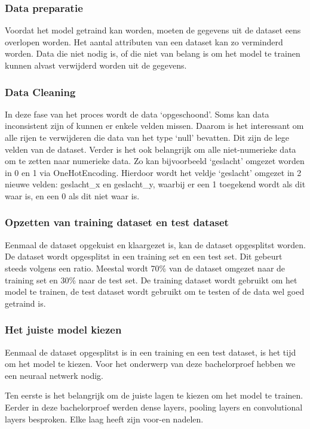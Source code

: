\subsubsection{Data preparatie}
\label{sec:datapreparatie}
Voordat het model getraind kan worden, moeten de gegevens uit de dataset eens overlopen worden. Het aantal attributen van een dataset kan zo verminderd worden. Data die niet nodig is, of die niet van belang is om het model te trainen kunnen alvast verwijderd worden uit de gegevens. 

\subsubsection{Data Cleaning}
\label{sec:datacleaning}
In deze fase van het proces wordt de data ‘opgeschoond’. Soms kan data inconsistent zijn of kunnen er enkele velden missen. Daarom is het interessant om alle rijen te verwijderen die data van het type ‘null’ bevatten. Dit zijn de lege velden van de dataset. Verder is het ook belangrijk om alle niet-numerieke data om te zetten naar numerieke data. Zo kan bijvoorbeeld ‘geslacht’ omgezet worden in 0 en 1 via \gls{OneHotEncoding}. Hierdoor wordt het veldje ‘geslacht’ omgezet in 2 nieuwe velden: geslacht\_x en geslacht\_y, waarbij er een 1 toegekend wordt als dit waar is, en een 0 als dit niet waar is. 

\subsubsection{Opzetten van training dataset en test dataset}
\label{sec:opzetten}
Eenmaal de dataset opgekuist en klaargezet is, kan de dataset opgesplitst worden. De dataset wordt opgesplitst in een training set en een test set. Dit gebeurt steeds volgens een ratio. Meestal wordt 70\% van de dataset omgezet naar de training set en 30\% naar de test set. De training dataset wordt gebruikt om het model te trainen, de test dataset wordt gebruikt om te testen of de data wel goed getraind is. 

\subsubsection{Het juiste model kiezen}
\label{sec:model}
Eenmaal de dataset opgesplitst is in een training en een test dataset, is het tijd om het model te kiezen. Voor het onderwerp van deze bachelorproef hebben we een neuraal netwerk nodig. 

Ten eerste is het belangrijk om de juiste lagen te kiezen om het model te trainen. Eerder in deze bachelorproef werden dense layers, pooling layers en convolutional layers besproken. Elke laag heeft zijn voor-en nadelen. 


